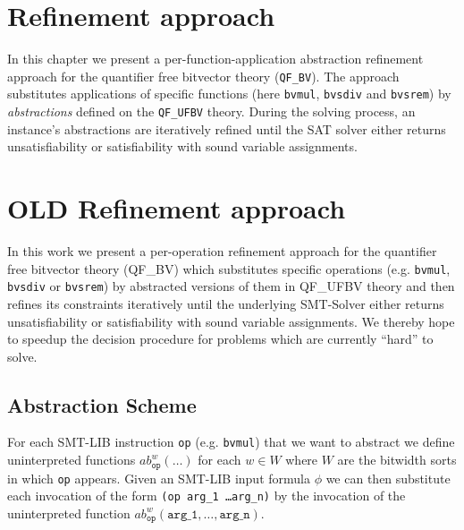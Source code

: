 \chapter{Refinement approach}
In this chapter we present a per-function-application abstraction refinement approach for the quantifier free bitvector theory (\texttt{QF\_BV}).
The approach substitutes applications of specific functions (here \texttt{bvmul}, \texttt{bvsdiv} and \texttt{bvsrem}) by \textit{abstractions} defined on the \texttt{QF\_UFBV} theory.
During the solving process, an instance's abstractions are iteratively refined until the SAT solver either returns unsatisfiability or satisfiability with sound variable assignments.









































\chapter{OLD Refinement approach}
\label{ch:refinement_approach}
In this work we present a per-operation refinement approach for the quantifier free bitvector theory (QF\_BV) which substitutes specific operations (e.g. \texttt{bvmul}, \texttt{bvsdiv} or \texttt{bvsrem}) by abstracted versions of them in QF\_UFBV theory and then refines its constraints iteratively until the underlying SMT-Solver either returns unsatisfiability or satisfiability with sound variable assignments. We thereby hope to speedup the decision procedure for problems which are currently \enquote{hard} to solve.

\section{Abstraction Scheme}
\label{sec:refinement_approach:abstraction_scheme}
For each SMT-LIB instruction \texttt{op} (e.g. \texttt{bvmul}) that we want to abstract we define uninterpreted functions $ab_{\texttt{op}}^w\left(\dots\right)$ for each $w\in W$ where $W$ are the bitwidth sorts in which \texttt{op} appears.
Given an SMT-LIB input formula $\phi$ we can then substitute each invocation of the form \texttt{(op arg\_1 \dots arg\_n)} by the invocation of the uninterpreted function $ab_{\texttt{op}}^w\left(\texttt{arg\_1}, \dots, \texttt{arg\_n}\right)$.


